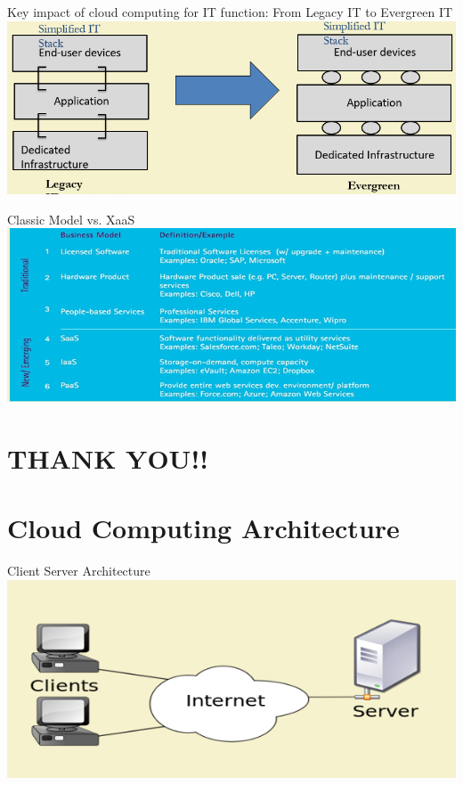 \documentclass{SKP-beamer}
\begin{document}
\begin{frame}{Key impact of cloud computing for IT function:
		From Legacy IT to Evergreen IT}
	\includegraphics[scale=0.6]{o.png}
\end{frame}

\begin{frame}{Classic Model	vs.	XaaS}
	\includegraphics[scale=0.7]{p.png}
\end{frame}


\section{\textbf{THANK YOU!!}}

\section{\textbf{Cloud Computing Architecture}}

\begin{frame}{Client Server Architecture}
	\includegraphics[scale=0.8]{q.png}
\end{frame}
\end{document}
